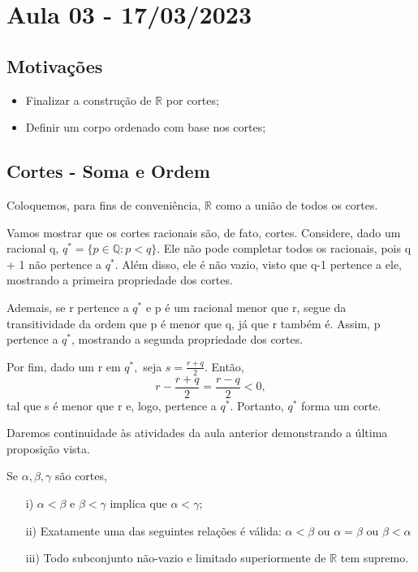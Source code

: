 \documentclass[Analysis/analysis_notes.tex]{subfiles}
\begin{document}
\section{Aula 03 - 17/03/2023}
\subsection{Motiva\c c\~oes}
\begin{itemize}
	\item Finalizar a constru\c c\~ao de $\mathbb{R}$ por cortes;
	\item Definir um corpo ordenado com base nos cortes;
\end{itemize}
\subsection{Cortes - Soma e Ordem}
Coloquemos, para fins de conveni\^encia, $\mathbb{R}$ como a uni\~ao de todos os cortes.

Vamos mostrar que os cortes racionais s\~ao, de fato, cortes. Considere, dado um racional q, $q^{*} = \{p\in \mathbb{Q}: p < q\}.$
Ele n\~ao pode completar todos os racionais, pois q + 1 n\~ao pertence a $q^{*}$. Al\'em disso, ele \'e n\~ao vazio, visto que
q-1 pertence a ele, mostrando a primeira propriedade dos cortes.

Ademais, se r pertence a $q^{*}$ e p \'e um racional menor que r, segue da transitividade da ordem que p \'e menor que
q, j\'a que r tamb\'em \'e. Assim, p pertence a $q^{*}$, mostrando a segunda propriedade dos cortes.

Por fim, dado um r em $q^{*},$ seja $s = \displaystyle \frac{r + q}{2}$. Ent\~ao,
$$
	r - \frac{r+q}{2} = \frac{r - q}{2} < 0,
$$
tal que s \'e menor que r e, logo, pertence a $q^{*}$. Portanto, $q^{*}$ forma um corte.

Daremos continuidade \`as atividades da aula anterior demonstrando a \'ultima proposi\c c\~ao vista.
\begin{prop*}
	Se $\alpha, \beta, \gamma$ s\~ao cortes,
	\begin{itemize}
		\item[i)] $\alpha < \beta$ e $\beta < \gamma$ implica que $\alpha < \gamma$;
		\item[ii)] Exatamente uma das seguintes rela\c c\~oes \'e v\'alida: $\alpha < \beta$ ou $\alpha = \beta$ ou $\beta < \alpha$
		\item[iii)] Todo subconjunto n\~ao-vazio e limitado superiormente de $\mathbb{R}$ tem supremo.
	\end{itemize}
\end{prop*}
\end{document}
